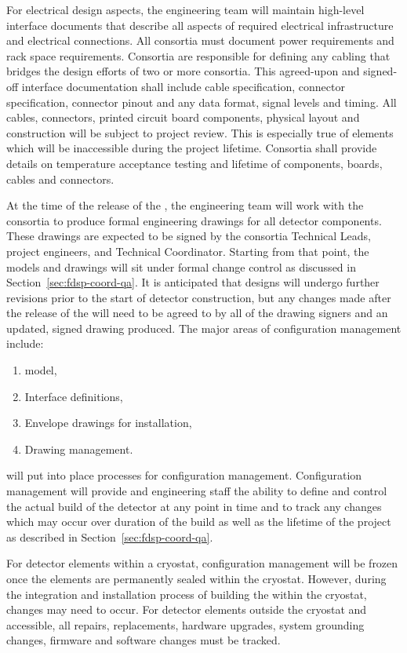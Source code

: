 For electrical design aspects, the  engineering team will maintain
high-level interface documents that describe all aspects of required
electrical infrastructure and electrical connections. All consortia
must document power requirements and rack space
requirements. Consortia are responsible for defining any cabling that
bridges the design efforts of two or more consortia. This agreed-upon
and signed-off interface documentation shall include cable
specification, connector specification, connector pinout and any data
format, signal levels and timing. All cables, connectors, printed
circuit board components, physical layout and construction will be
subject to project review. This is especially true of elements which
will be inaccessible during the project lifetime. Consortia shall
provide details on \lar temperature acceptance testing and
lifetime of components, boards, cables and connectors.


At the time of the release of the , the
 engineering team will work with the consortia to produce
formal engineering drawings for all detector components.  These
drawings are expected to be signed by the consortia Technical Leads,
project engineers, and Technical Coordinator.  Starting from that
point, the  models and drawings will sit under formal change
control as discussed in Section~\ref{sec:fdsp-coord-qa}.  It is
anticipated that designs will undergo further revisions prior to the
start of detector construction, but any changes made after the release
of the  will need to be agreed to by all of
the drawing signers and an updated, signed drawing produced. The major
areas of configuration management include:
\begin{enumerate}
  \item \threed model,
  \item Interface definitions,
  \item Envelope drawings for installation,
  \item Drawing management.
\end{enumerate}

 will put into place processes for configuration
management.  Configuration management will provide 
and engineering staff the ability to define and control
the actual build of the detector at any point in time and to track any
changes which may occur over duration of the build as well as the
lifetime of the project as described in
Section~\ref{sec:fdsp-coord-qa}.

For detector elements within a cryostat, configuration management
will be frozen once the elements are permanently sealed within the
cryostat.  However, during the integration and installation process of
building the  within the cryostat, changes may need to occur.
For detector elements outside the cryostat and accessible, all
repairs, replacements, hardware upgrades, system grounding changes,
firmware and software changes must be tracked.

